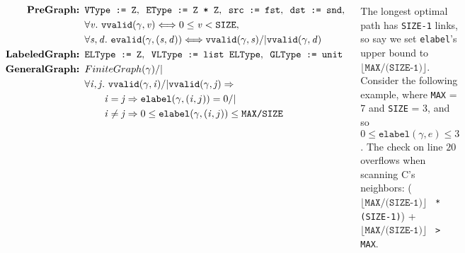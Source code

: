 \documentclass[a0paper, fleqn]{tikzposter}
\newcommand{\p}[1]{\ensuremath{\mathsf{#1}}} %
\newcommand{\m}[1]{\ensuremath{\mathit{#1}}} %
\newcommand{\sz}{\texttt{SIZE}}
\begin{document}
\begin{columns}
\block{Instantiating \p{DijkGraph}}
{
\begin{flushleft}
\begin{equation*}
\begin{split}
\textbf{PreGraph: } &\texttt{VType := Z}, \texttt{ EType := Z * Z}, \texttt{ src := fst}, \texttt{ dst := snd},\\ 
                    &\forall \m{v}.~\texttt{vvalid}(\gamma, \m{v}) <=> 0 \le \m{v} < {\sz}, \\
                    &\forall \m{s,d}.~\texttt{evalid}(\gamma, \m{(s,d)}) <=> \texttt{vvalid}(\gamma, \m{s}) /| \texttt{vvalid}(\gamma, \m{d}) \\
\textbf{LabeledGraph: } &\texttt{ELType := Z}, \texttt{ VLType := list ELType}, \texttt{ GLType := unit} \\
\textbf{GeneralGraph: } &FiniteGraph(\gamma) /| \null \\
&\forall \m{i,j}.~\texttt{vvalid}(\gamma, \m{i}) /| \texttt{vvalid}(\gamma, \m{j}) => \\
&\qquad \m{i} = \m{j} => \texttt{elabel}(\gamma,(\m{i},{j})) = 0 /| \null \\
&\qquad \m{i} \neq \m{j} => 0 \le \texttt{elabel}(\gamma,(\m{i},{j})) \le \texttt{MAX/SIZE}
\end{split}
\end{equation*}
\end{flushleft}
\vspace{-1.5em}
}%

{
The longest optimal path has \texttt{SIZE-1} links, so say we set \texttt{elabel}'s upper bound to $\lfloor\texttt{MAX/(SIZE-1)}\rfloor$. Consider the following example, where \texttt{MAX} = 7 and \texttt{SIZE} = 3, and so $0 \le \texttt{elabel}(\gamma, \m{e}) \le 3$. The check on line $20$ overflows when scanning C's neighbors: ($\lfloor\texttt{MAX/(SIZE-1)}\rfloor$ \texttt{ * (SIZE-1)}) + $\lfloor\texttt{MAX/(SIZE-1)}\rfloor$ \texttt{ > MAX}.
\vspace{0.5em}


{\centering
{}

}}
\end{columns}
\end{document}
